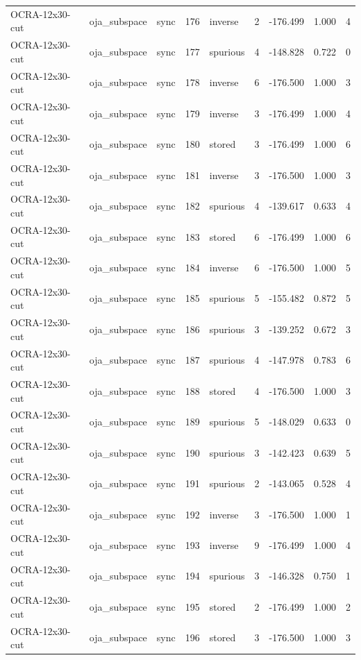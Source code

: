 \begin{tabular}{lllrlrrrr}
OCRA-12x30-cut & oja\_subspace & sync & 176 & inverse & 2 & -176.499 & 1.000 & 4 \\
OCRA-12x30-cut & oja\_subspace & sync & 177 & spurious & 4 & -148.828 & 0.722 & 0 \\
OCRA-12x30-cut & oja\_subspace & sync & 178 & inverse & 6 & -176.500 & 1.000 & 3 \\
OCRA-12x30-cut & oja\_subspace & sync & 179 & inverse & 3 & -176.499 & 1.000 & 4 \\
OCRA-12x30-cut & oja\_subspace & sync & 180 & stored & 3 & -176.499 & 1.000 & 6 \\
OCRA-12x30-cut & oja\_subspace & sync & 181 & inverse & 3 & -176.500 & 1.000 & 3 \\
OCRA-12x30-cut & oja\_subspace & sync & 182 & spurious & 4 & -139.617 & 0.633 & 4 \\
OCRA-12x30-cut & oja\_subspace & sync & 183 & stored & 6 & -176.499 & 1.000 & 6 \\
OCRA-12x30-cut & oja\_subspace & sync & 184 & inverse & 6 & -176.500 & 1.000 & 5 \\
OCRA-12x30-cut & oja\_subspace & sync & 185 & spurious & 5 & -155.482 & 0.872 & 5 \\
OCRA-12x30-cut & oja\_subspace & sync & 186 & spurious & 3 & -139.252 & 0.672 & 3 \\
OCRA-12x30-cut & oja\_subspace & sync & 187 & spurious & 4 & -147.978 & 0.783 & 6 \\
OCRA-12x30-cut & oja\_subspace & sync & 188 & stored & 4 & -176.500 & 1.000 & 3 \\
OCRA-12x30-cut & oja\_subspace & sync & 189 & spurious & 5 & -148.029 & 0.633 & 0 \\
OCRA-12x30-cut & oja\_subspace & sync & 190 & spurious & 3 & -142.423 & 0.639 & 5 \\
OCRA-12x30-cut & oja\_subspace & sync & 191 & spurious & 2 & -143.065 & 0.528 & 4 \\
OCRA-12x30-cut & oja\_subspace & sync & 192 & inverse & 3 & -176.500 & 1.000 & 1 \\
OCRA-12x30-cut & oja\_subspace & sync & 193 & inverse & 9 & -176.499 & 1.000 & 4 \\
OCRA-12x30-cut & oja\_subspace & sync & 194 & spurious & 3 & -146.328 & 0.750 & 1 \\
OCRA-12x30-cut & oja\_subspace & sync & 195 & stored & 2 & -176.499 & 1.000 & 2 \\
OCRA-12x30-cut & oja\_subspace & sync & 196 & stored & 3 & -176.500 & 1.000 & 3 \\

\end{tabular}
